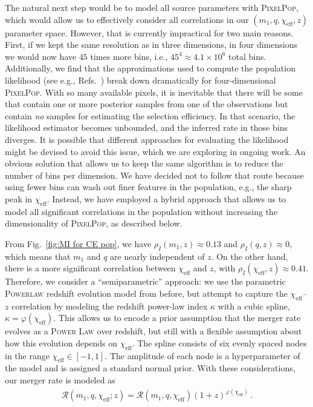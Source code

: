 \documentclass[twocolumn, twocolappendix]{aastex631}
\newcommand{\chieff}{\ensuremath{\chi_\mathrm{eff}}}
\newcommand{\pr}{\textsc{Power Law}\xspace}
\newcommand{\PixelPop}{\textsc{PixelPop}\xspace}
\begin{document}
The natural next step would be to model all source parameters with \PixelPop, which would allow us to effectively consider all correlations in our $(m_1,q,\chieff,z)$ parameter space. However, that is currently impractical for two main reasons. First, if we kept the same resolution as in three dimensions, in four dimensions we would now have $45$ times more bins, i.e., $45^4 \approx 4.1 \times 10^6$ total bins. Additionally, we find that the approximations used to compute the population likelihood (see e.g., Refs.~\citep{Vitale:2020aaz,Thrane:2018qnx,Callister:2024cdx,LIGOScientific:2018jsj,LIGOScientific:2020kqk,KAGRA:2021duu,Tiwari:2017ndi,Farr_2019}) break down dramatically for four-dimensional \PixelPop. With so many available pixels, it is inevitable that there will be some that contain one or more posterior samples from one of the observations but contain \textit{no} samples for estimating the selection efficiency. In that scenario, the likelihood estimator becomes unbounded, and the inferred rate in those bins diverges. It is possible that different approaches for evaluating the likelihood might be devised to avoid this issue, which we are exploring in ongoing work. An obvious solution that allows us to keep the same algorithm is to reduce the number of bins per dimension. We have decided not to follow that route because using fewer bins can wash out finer features in the population, e.g., the sharp peak in $\chieff$. 
Instead, we have employed a hybrid approach that allows us to model all significant correlations in the population without increasing the dimensionality of \PixelPop, as described below.

From Fig.~\ref{fig:MI for CE pop}, we have $\rho_I(m_1,z) \approx 0.13$ and $\rho_I(q,z) \approx 0$, which means that $m_1$ and $q$ are nearly independent of $z$. On the other hand, there is a more significant correlation between $\chi_\mathrm{eff}$ and $z$, with $\rho_I(\chi_\mathrm{eff},z) \approx 0.41$.
Therefore, we consider a ``semiparametric'' approach: we use the parametric \textsc{Powerlaw} redshift evolution model from before, but attempt to capture the $\chieff$--$z$ correlation by modeling the redshift power-law index $\kappa$ with a cubic spline, $\kappa=\varphi(\chieff)$. This allows us to encode a prior assumption that the merger rate evolves as a \pr over redshift, but still with a flexible assumption about how this evolution depends on $\chi_\mathrm{eff}$.
The spline consists of six evenly spaced nodes in the range $\chieff \in [-1,1]$. The amplitude of each node is a hyperparameter of the model and is assigned a standard normal prior. With these considerations, our merger rate is modeled as
\begin{align}
\label{eq:(3+1)d-model}
\mathcal{R}(m_1,q,\chieff;z)
=
\mathcal{R}(m_1,q,\chieff) (1+z)^{\varphi(\chieff)}
\, .
\end{align}
\end{document}
